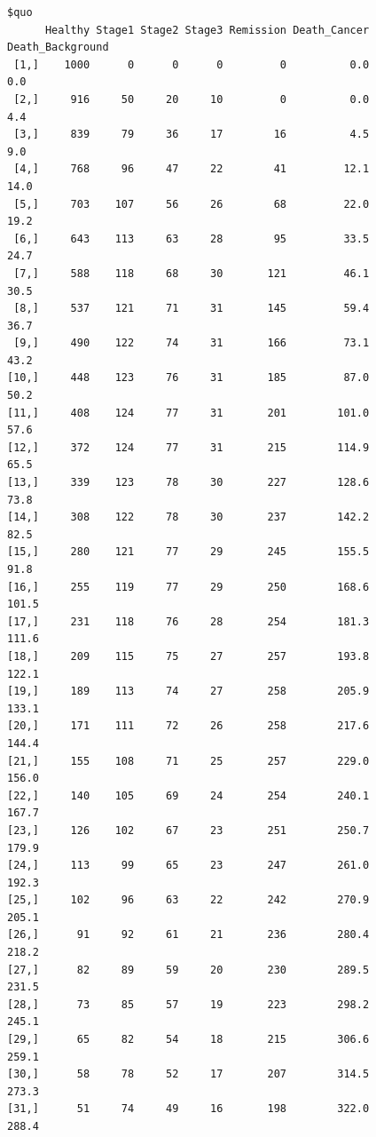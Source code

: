 \documentclass[
  letterpaper,
  DIV=11,
  numbers=noendperiod]{scrartcl}
\begin{document}
\begin{verbatim}
$quo
      Healthy Stage1 Stage2 Stage3 Remission Death_Cancer Death_Background
 [1,]    1000      0      0      0         0          0.0              0.0
 [2,]     916     50     20     10         0          0.0              4.4
 [3,]     839     79     36     17        16          4.5              9.0
 [4,]     768     96     47     22        41         12.1             14.0
 [5,]     703    107     56     26        68         22.0             19.2
 [6,]     643    113     63     28        95         33.5             24.7
 [7,]     588    118     68     30       121         46.1             30.5
 [8,]     537    121     71     31       145         59.4             36.7
 [9,]     490    122     74     31       166         73.1             43.2
[10,]     448    123     76     31       185         87.0             50.2
[11,]     408    124     77     31       201        101.0             57.6
[12,]     372    124     77     31       215        114.9             65.5
[13,]     339    123     78     30       227        128.6             73.8
[14,]     308    122     78     30       237        142.2             82.5
[15,]     280    121     77     29       245        155.5             91.8
[16,]     255    119     77     29       250        168.6            101.5
[17,]     231    118     76     28       254        181.3            111.6
[18,]     209    115     75     27       257        193.8            122.1
[19,]     189    113     74     27       258        205.9            133.1
[20,]     171    111     72     26       258        217.6            144.4
[21,]     155    108     71     25       257        229.0            156.0
[22,]     140    105     69     24       254        240.1            167.7
[23,]     126    102     67     23       251        250.7            179.9
[24,]     113     99     65     23       247        261.0            192.3
[25,]     102     96     63     22       242        270.9            205.1
[26,]      91     92     61     21       236        280.4            218.2
[27,]      82     89     59     20       230        289.5            231.5
[28,]      73     85     57     19       223        298.2            245.1
[29,]      65     82     54     18       215        306.6            259.1
[30,]      58     78     52     17       207        314.5            273.3
[31,]      51     74     49     16       198        322.0            288.4


\end{verbatim}
\end{document}
